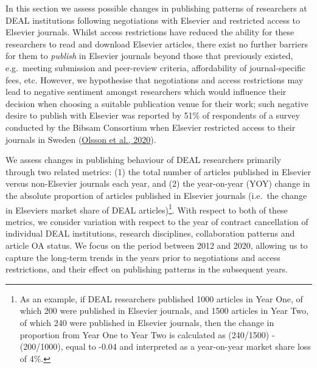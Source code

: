 \documentclass[
]{article}
\begin{document}
In this section we assess possible changes in publishing patterns of researchers at DEAL institutions following negotiations with Elsevier and restricted access to Elsevier journals. Whilst access restrictions have reduced the ability for these researchers to read and download Elsevier articles, there exist no further barriers for them to \emph{publish} in Elsevier journals beyond those that previously existed, e.g.~meeting submission and peer-review criteria, affordability of journal-specific fees, etc. However, we hypothesise that negotiations and access restrictions may lead to negative sentiment amongst researchers which would influence their decision when choosing a suitable publication venue for their work; such negative desire to publish with Elsevier was reported by 51\% of respondents of a survey conducted by the Bibsam Consortium when Elsevier restricted access to their journals in Sweden (\href{http://doi.org/10.1629/uksg.507}{Olsson et al., 2020}).

We assess changes in publishing behaviour of DEAL researchers primarily through two related metrics: (1) the total number of articles published in Elsevier versus non-Elsevier journals each year, and (2) the year-on-year (YOY) change in the absolute proportion of articles published in Elsevier journals (i.e.~the change in Elsevier\textquotesingle s market share of DEAL articles)\footnote{As an example, if DEAL researchers published 1000 articles in Year One, of which 200 were published in Elsevier journals, and 1500 articles in Year Two, of which 240 were published in Elsevier journals, then the change in proportion from Year One to Year Two is calculated as (240/1500) - (200/1000), equal to -0.04 and interpreted as a year-on-year market share loss of 4\%.}. With respect to both of these metrics, we consider variation with respect to the year of contract cancellation of individual DEAL institutions, research disciplines, collaboration patterns and article OA status. We focus on the period between 2012 and 2020, allowing us to capture the long-term trends in the years prior to negotiations and access restrictions, and their effect on publishing patterns in the subsequent years.
\end{document}
